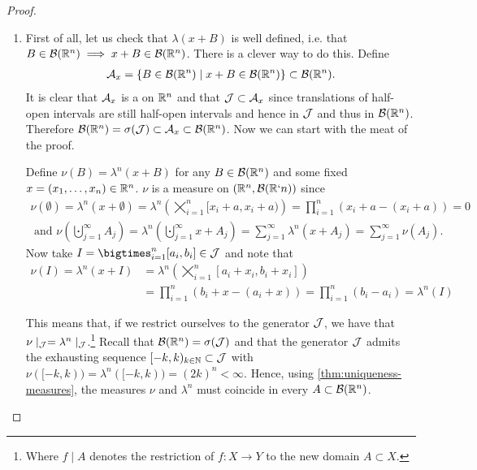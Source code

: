 \begin{proof}$ $\newline
	\begin{enumerate}
		\item First of all, let us check that $\lambda(x + B)$ is well defined, i.e. that $B \in \mathcal{B}(\mathbb{R}^n) \implies x + B \in \mathcal{B}(\mathbb{R}^n)$. There is a clever way to do this. Define
		\begin{align*}
			\mathcal{A}_x = \{B \in \mathcal{B}(\mathbb{R}^n) \mid x + B \in \mathcal{B}(\mathbb{R}^n)\} \subset \mathcal{B}(\mathbb{R}^n).
		\end{align*}
		It is clear that $\mathcal{A}_x$ is a \siga on $\mathbb{R}^n$ and that $\mathcal{J} \subset \mathcal{A}_x$ since translations of half-open intervals are still half-open intervals and hence in $\mathcal{J}$ and thus in $\mathcal{B}(\mathbb{R}^n)$. Therefore $\mathcal{B}(\mathbb{R}^n) = \sigma(\mathcal{J}) \subset \mathcal{A}_x \subset \mathcal{B}(\mathbb{R}^n)$. Now we can start with the meat of the proof.
		
		Define $\nu(B) = \lambda^n(x + B)$ for any $B \in \mathcal{B}(\mathbb{R}^n)$ and some fixed $x =(x_1, \dots, x_n) \in \mathbb{R}^n$. $\nu$ is a measure on $(\mathbb{R}^n, \mathcal{B}(\mathbb{R}`n))$ since
		\begin{align*}
			\nu(\emptyset) = \lambda^n(x + \emptyset) = \lambda^n\left(\bigtimes_{i = 1}^n [x_i + a, x_i + a)\right) = \prod_{i=1}^n (x_i + a - (x_i + a)) = 0\\
			\text{ and }\nu\left(\bigcupdot_{j = 1}^\infty A_j \right) = \lambda^n\left(\bigcupdot_{j = 1}^\infty x + A_j\right) = \sum_{j = 1}^\infty \lambda^n (x + A_j) = \sum_{j = 1}^\infty \nu(A_j).
		\end{align*}
		Now take $I = \bigtimes_{i = 1}^n [a_i, b_i] \in \calJ$ and note that
		\begin{align*}
			\nu(I) = \lambda^n(x + I) &= \lambda^n \left(\bigtimes_{i = 1}^n [a_i + x_i, b_i + x_i]\right) \\
			&= \prod_{i=1}^n (b_i + x - (a_i + x)) = \prod_{i=1}^n (b_i - a_i) = \lambda^n(I)
		\end{align*}
		
		This means that, if we restrict ourselves to the generator $\mathcal{J}$, we have that $\nu\mid_{\mathcal{J}} = \lambda^n\mid_{\mathcal{J}}$.\footnote{Where $f\mid A$ denotes the restriction of $f: X \to Y$ to the new domain $A \subset X$.} Recall that $\mathcal{B}(\mathbb{R}^n) = \sigma(\mathcal{J})$ and that the generator $\mathcal{J}$ admits the exhausting sequence $[-k, k)_{k \in \mathbb{N}} \subset \mathcal{J}$ with $\nu([-k, k)) = \lambda^n([-k, k)) = (2k)^n < \infty$. Hence, using \autoref{thm:uniqueness-measures}, the measures $\nu$ and $\lambda^n$ must coincide in every $A \subset \mathcal{B}(\mathbb{R}^n)$.
		

\end{enumerate}
\end{proof}
